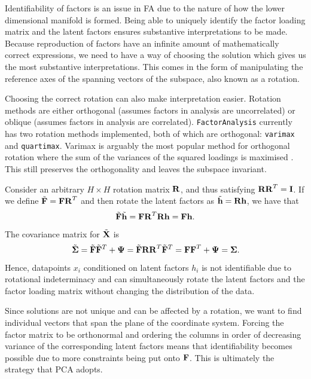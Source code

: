 \documentclass[12pt, letterpaper]{article}
\begin{document}

Identifiability of factors is an issue in FA due to the nature of how the lower dimensional manifold is formed. Being able to uniquely identify the factor loading matrix and the latent factors ensures substantive interpretations to be made. Because reproduction of factors have an infinite amount of mathematically correct expressions, we need to have a way of choosing the solution which gives us the most substantive interpretations. This comes in the form of manipulating the reference axes of the spanning vectors of the subspace, also known as a rotation. 

Choosing the correct rotation can also make interpretation easier. Rotation methods are either orthogonal (assumes factors in analysis are uncorrelated) or oblique (assumes factors in analysis are correlated). \texttt{FactorAnalysis} currently has two rotation methods implemented, both of which are orthogonal: \texttt{varimax} and \texttt{quartimax}. Varimax is arguably the most popular method for orthogonal rotation where the sum of the variances of the squared loadings is maximised \citep{kaiser1958varimax}. This still preserves the orthogonality and leaves the subspace invariant.

Consider an arbitrary $H\times H$ rotation matrix $\vb{R}$, and thus satisfying $\vb{RR}^T=\vb{I}$. If we define $\Tilde{\vb{F}}= \vb{FR}^T$ and then rotate the latent factors as $\Tilde{\vb{h}}= \vb{Rh}$, we have that
$$\Tilde{\vb{F}}\Tilde{\vb{h}} = \vb{FR}^T\vb{Rh}=\vb{Fh}.$$
The covariance matrix for $\Tilde{\vb{X}}$ is 
$$\Tilde{\vb{\Sigma}}= \Tilde{\vb{F}}\Tilde{\vb{F}}^T + \vb{\Psi} = \Tilde{\vb{F}}\vb{RR}^T\Tilde{\vb{F}}^T=\vb{FF}^T+\vb{\Psi}=\vb{\Sigma}.$$
Hence, datapoints $x_i$ conditioned on latent factors $h_i$ is not identifiable due to rotational indeterminacy and can simultaneously rotate the latent factors and the factor loading matrix without changing the distribution of the data.

Since solutions are not unique and can be affected by a rotation, we want to find individual vectors that span the plane of the coordinate system. Forcing the factor matrix to be orthonormal and ordering the columns in order of decreasing variance of the corresponding latent factors means that identifiability becomes possible due to more constraints being put onto $\vb{F}$. This is ultimately the strategy that PCA adopts.
\end{document}
